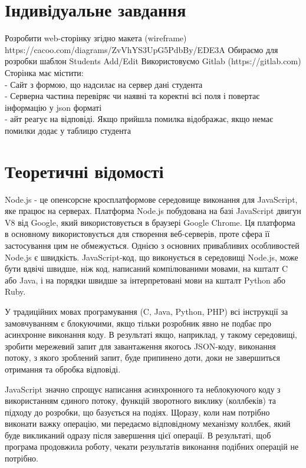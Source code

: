 \documentclass{article}
\begin{document}
\begin{normalsize}
\section*{Індивідуальне завдання}
Розробити web-сторінку згідно макета (wireframe)
https://cacoo.com/diagrams/ZvVhYS3UpG5PdbBy/EDE3A
Обираємо для розробки шаблон Students Add/Edit
Використовуємо Gitlab (https://gitlab.com)
Сторінка має містити:\\
- Сайт з формою, що надсилає на сервер дані студента\\
- Серверна частина перевіряє чи наявні та коректні всі поля і повертає інформацію у json форматі\\
- айт реагує на відповіді. Якщо прийшла помилка відображає, якщо немає помилки додає у
таблицю студента\\

\section*{Теоретичні відомості}
Node.js - це опенсорсне кросплатформове середовище виконання для JavaScript, яке
працює на серверах.
Платформа Node.js побудована на базі JavaScript двигун V8 від Google, який
використовується в браузері Google Chrome. Ця платформа в основному використовується
для створення веб-серверів, проте сфера її застосування цим не обмежується.
Однією з основних привабливих особливостей Node.js є швидкість. JavaScript-код,
що виконується в середовищі Node.js, може бути вдвічі швидше, ніж код, написаний
компілюваними мовами, на кшталт C або Java, і на порядки швидше за інтерпретовані
мови на кшталт Python або Ruby.

У традиційних мовах програмування (C, Java, Python, PHP) всі інструкції за
замовчуванням є блокуючими, якщо тільки розробник явно не подбає про асинхронне
виконання коду. В результаті якщо, наприклад, у такому середовищі, зробити мережевий
запит для завантаження якогось JSON-коду, виконання потоку, з якого зроблений запит,
буде припинено доти, доки не завершиться отримання та обробка відповіді.

JavaScript значно спрощує написання асинхронного та неблокуючого коду з
використанням єдиного потоку, функцій зворотного виклику (коллбеків) та підходу до
розробки, що базується на подіях. Щоразу, коли нам потрібно виконати важку операцію,
ми передаємо відповідному механізму коллбек, який буде викликаний одразу після
завершення цієї операції. В результаті, щоб програма продовжила роботу, чекати
результатів виконання подібних операцій не потрібно.


\end{normalsize}
\end{document}
